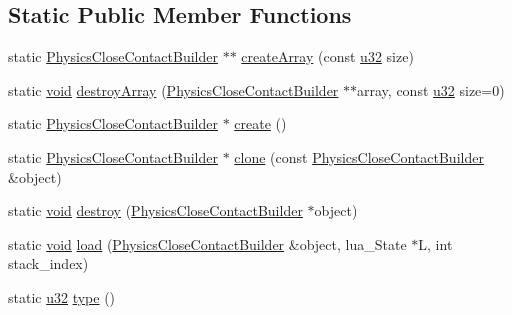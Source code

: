 \subsection*{Static Public Member Functions}
\begin{DoxyCompactItemize}
\item 
static \mbox{\hyperlink{classnjli_1_1_physics_close_contact_builder}{Physics\+Close\+Contact\+Builder}} $\ast$$\ast$ \mbox{\hyperlink{classnjli_1_1_physics_close_contact_builder_a6f9588a2c58867b6b5000c42a2504c6b}{create\+Array}} (const \mbox{\hyperlink{_util_8h_a10e94b422ef0c20dcdec20d31a1f5049}{u32}} size)
\item 
static \mbox{\hyperlink{_thread_8h_af1e856da2e658414cb2456cb6f7ebc66}{void}} \mbox{\hyperlink{classnjli_1_1_physics_close_contact_builder_abe100858f28e115edef5b0605ae4b669}{destroy\+Array}} (\mbox{\hyperlink{classnjli_1_1_physics_close_contact_builder}{Physics\+Close\+Contact\+Builder}} $\ast$$\ast$array, const \mbox{\hyperlink{_util_8h_a10e94b422ef0c20dcdec20d31a1f5049}{u32}} size=0)
\item 
static \mbox{\hyperlink{classnjli_1_1_physics_close_contact_builder}{Physics\+Close\+Contact\+Builder}} $\ast$ \mbox{\hyperlink{classnjli_1_1_physics_close_contact_builder_afa51854834987b555e41b0c10c74c180}{create}} ()
\item 
static \mbox{\hyperlink{classnjli_1_1_physics_close_contact_builder}{Physics\+Close\+Contact\+Builder}} $\ast$ \mbox{\hyperlink{classnjli_1_1_physics_close_contact_builder_a0879ce808e41a39aaae70da300a730f1}{clone}} (const \mbox{\hyperlink{classnjli_1_1_physics_close_contact_builder}{Physics\+Close\+Contact\+Builder}} \&object)
\item 
static \mbox{\hyperlink{_thread_8h_af1e856da2e658414cb2456cb6f7ebc66}{void}} \mbox{\hyperlink{classnjli_1_1_physics_close_contact_builder_a11118573af1d447f3b5861a266d05f85}{destroy}} (\mbox{\hyperlink{classnjli_1_1_physics_close_contact_builder}{Physics\+Close\+Contact\+Builder}} $\ast$object)
\item 
static \mbox{\hyperlink{_thread_8h_af1e856da2e658414cb2456cb6f7ebc66}{void}} \mbox{\hyperlink{classnjli_1_1_physics_close_contact_builder_a096a8b84177a18c7f0f351b8a89c84de}{load}} (\mbox{\hyperlink{classnjli_1_1_physics_close_contact_builder}{Physics\+Close\+Contact\+Builder}} \&object, lua\+\_\+\+State $\ast$L, int stack\+\_\+index)
\item 
static \mbox{\hyperlink{_util_8h_a10e94b422ef0c20dcdec20d31a1f5049}{u32}} \mbox{\hyperlink{classnjli_1_1_physics_close_contact_builder_a7dc46e313576f83c2297da3094b85918}{type}} ()
\end{DoxyCompactItemize}
